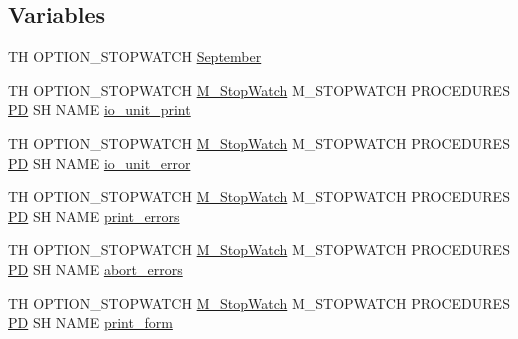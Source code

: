 \subsection*{Variables}
\begin{DoxyCompactItemize}
\item 
TH O\+P\+T\+I\+O\+N\+\_\+\+S\+T\+O\+P\+W\+A\+T\+CH \hyperlink{option__stopwatch_83_8txt_acc3d7c797b4f4947458d4eda2991d70a}{September}
\item 
TH O\+P\+T\+I\+O\+N\+\_\+\+S\+T\+O\+P\+W\+A\+T\+CH \hyperlink{option__stopwatch_83_8txt_aa2011fc45a5e502e87ee50996a8a9305}{M\+\_\+\+Stop\+Watch} M\+\_\+\+S\+T\+O\+P\+W\+A\+T\+CH P\+R\+O\+C\+E\+D\+U\+R\+ES \hyperlink{what__overview_81_8txt_a85f26da5a4481fbdb0d9c79f2b94de3e}{PD} SH N\+A\+ME \hyperlink{option__stopwatch_83_8txt_a4fe5427ea57805c6d78b77a54a002e36}{io\+\_\+unit\+\_\+print}
\item 
TH O\+P\+T\+I\+O\+N\+\_\+\+S\+T\+O\+P\+W\+A\+T\+CH \hyperlink{option__stopwatch_83_8txt_aa2011fc45a5e502e87ee50996a8a9305}{M\+\_\+\+Stop\+Watch} M\+\_\+\+S\+T\+O\+P\+W\+A\+T\+CH P\+R\+O\+C\+E\+D\+U\+R\+ES \hyperlink{what__overview_81_8txt_a85f26da5a4481fbdb0d9c79f2b94de3e}{PD} SH N\+A\+ME \hyperlink{option__stopwatch_83_8txt_a5921418297454465f26a02b350456a4b}{io\+\_\+unit\+\_\+error}
\item 
TH O\+P\+T\+I\+O\+N\+\_\+\+S\+T\+O\+P\+W\+A\+T\+CH \hyperlink{option__stopwatch_83_8txt_aa2011fc45a5e502e87ee50996a8a9305}{M\+\_\+\+Stop\+Watch} M\+\_\+\+S\+T\+O\+P\+W\+A\+T\+CH P\+R\+O\+C\+E\+D\+U\+R\+ES \hyperlink{what__overview_81_8txt_a85f26da5a4481fbdb0d9c79f2b94de3e}{PD} SH N\+A\+ME \hyperlink{option__stopwatch_83_8txt_aac742f39d25b161bfa9ac83be8041e45}{print\+\_\+errors}
\item 
TH O\+P\+T\+I\+O\+N\+\_\+\+S\+T\+O\+P\+W\+A\+T\+CH \hyperlink{option__stopwatch_83_8txt_aa2011fc45a5e502e87ee50996a8a9305}{M\+\_\+\+Stop\+Watch} M\+\_\+\+S\+T\+O\+P\+W\+A\+T\+CH P\+R\+O\+C\+E\+D\+U\+R\+ES \hyperlink{what__overview_81_8txt_a85f26da5a4481fbdb0d9c79f2b94de3e}{PD} SH N\+A\+ME \hyperlink{option__stopwatch_83_8txt_aeabdb3b9e9e255861c57d32f767aa203}{abort\+\_\+errors}
\item 
TH O\+P\+T\+I\+O\+N\+\_\+\+S\+T\+O\+P\+W\+A\+T\+CH \hyperlink{option__stopwatch_83_8txt_aa2011fc45a5e502e87ee50996a8a9305}{M\+\_\+\+Stop\+Watch} M\+\_\+\+S\+T\+O\+P\+W\+A\+T\+CH P\+R\+O\+C\+E\+D\+U\+R\+ES \hyperlink{what__overview_81_8txt_a85f26da5a4481fbdb0d9c79f2b94de3e}{PD} SH N\+A\+ME \hyperlink{option__stopwatch_83_8txt_a86ad7ca7471d1fef8c045a16cac49a65}{print\+\_\+form}
\item 

\end{DoxyCompactItemize}
